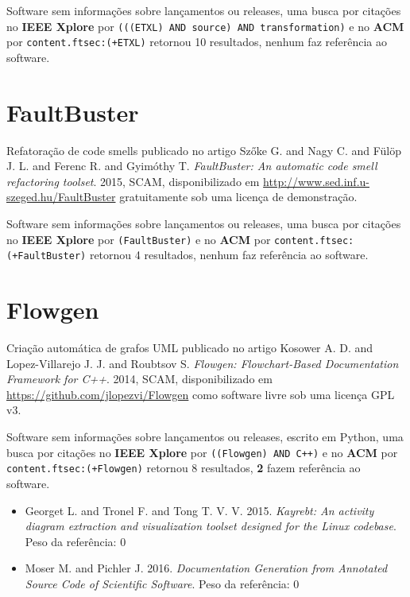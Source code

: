 Software sem informações sobre lançamentos ou releases,
uma busca por citações no {\bf IEEE Xplore} por
\texttt{(((ETXL) AND source) AND transformation)}
e no {\bf ACM} por
\texttt{content.ftsec:(+ETXL)}
retornou
10 resultados,
nenhum faz referência ao software.


\section{FaultBuster}

Refatoração de code smells
publicado no artigo
Szőke G. and Nagy C. and Fülöp J. L. and Ferenc R. and Gyimóthy T.
{\it FaultBuster: An automatic code smell refactoring toolset}.
2015,
SCAM,
disponibilizado em \url{http://www.sed.inf.u-szeged.hu/FaultBuster}
gratuitamente
sob uma licença de demonstração.

Software sem informações sobre lançamentos ou releases,
uma busca por citações no {\bf IEEE Xplore} por
\texttt{(FaultBuster)}
e no {\bf ACM} por
\texttt{content.ftsec:(+FaultBuster)}
retornou
4 resultados,
nenhum faz referência ao software.


\section{Flowgen}

Criação automática de grafos UML
publicado no artigo
Kosower A. D. and Lopez-Villarejo J. J. and Roubtsov S.
{\it Flowgen: Flowchart-Based Documentation Framework for C++}.
2014,
SCAM,
disponibilizado em \url{https://github.com/jlopezvi/Flowgen}
como software livre
sob uma licença GPL v3.

Software sem informações sobre lançamentos ou releases,
escrito em Python,
uma busca por citações no {\bf IEEE Xplore} por
\texttt{((Flowgen) AND C++)}
e no {\bf ACM} por
\texttt{content.ftsec:(+Flowgen)}
retornou
8 resultados,
{\bf 2} fazem referência ao software.

\begin{itemize}
\item Georget L. and Tronel F. and Tong T. V. V.
      2015.
      {\it Kayrebt: An activity diagram extraction and visualization toolset designed for the Linux codebase}.
      Peso da referência: 0
\item Moser M. and Pichler J.
      2016.
      {\it Documentation Generation from Annotated Source Code of Scientific Software}.
      Peso da referência: 0
\end{itemize}

